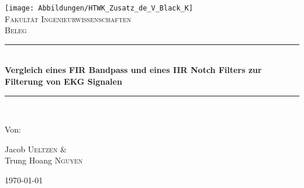 \begin{titlepage}
		
	\begin{center}
		
		\texttt{[image: Abbildungen/HTWK\_Zusatz\_de\_V\_Black\_K]}\\[4cm]
		\textsc{\LARGE Fakultät Ingenieurwissenschaften}\\[1.5cm]
		
		\textsc{\Large Beleg }\\[0.5cm]
		
		
		\newcommand{\HRule}{\rule{\linewidth}{0.5mm}}
		\HRule \\[0.4cm]
		{ \huge \bfseries Vergleich eines FIR Bandpass und eines IIR Notch Filters zur Filterung von EKG Signalen}\\[0.4cm]
		
		\HRule \\[1.5cm]
		
		\begin{minipage}{0.4\textwidth}
			\begin{flushleft} \large
				\begin{center}
					Von:\\
				\end{center}
				\begin{center}
					Jacob \textsc{Ueltzen} \& \\ Trung Hoang \textsc{Nguyen}\\
				\end{center}
			\end{flushleft}
		\end{minipage}
		\hfill
		
		
		\vfill
		
		{\large \today}
		
	\end{center}
	
\end{titlepage}
